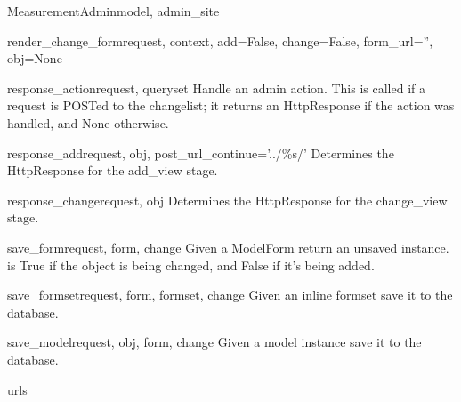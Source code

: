 \documentclass[letterpaper,10pt,english]{sphinxmanual}
\begin{document}
\begin{classdesc}{MeasurementAdmin}{model, admin\_site}
\hypertarget{data.admin.MeasurementAdmin.render_change_form}{}\begin{methoddesc}{render\_change\_form}{request, context, add=False, change=False, form\_url='', obj=None}\end{methoddesc}

\hypertarget{data.admin.MeasurementAdmin.response_action}{}\begin{methoddesc}{response\_action}{request, queryset}
Handle an admin action. This is called if a request is POSTed to the
changelist; it returns an HttpResponse if the action was handled, and
None otherwise.
\end{methoddesc}

\hypertarget{data.admin.MeasurementAdmin.response_add}{}\begin{methoddesc}{response\_add}{request, obj, post\_url\_continue='../\%s/'}
Determines the HttpResponse for the add\_view stage.
\end{methoddesc}

\hypertarget{data.admin.MeasurementAdmin.response_change}{}\begin{methoddesc}{response\_change}{request, obj}
Determines the HttpResponse for the change\_view stage.
\end{methoddesc}

\hypertarget{data.admin.MeasurementAdmin.save_form}{}\begin{methoddesc}{save\_form}{request, form, change}
Given a ModelForm return an unsaved instance.  is True if
the object is being changed, and False if it's being added.
\end{methoddesc}

\hypertarget{data.admin.MeasurementAdmin.save_formset}{}\begin{methoddesc}{save\_formset}{request, form, formset, change}
Given an inline formset save it to the database.
\end{methoddesc}

\hypertarget{data.admin.MeasurementAdmin.save_model}{}\begin{methoddesc}{save\_model}{request, obj, form, change}
Given a model instance save it to the database.
\end{methoddesc}

\hypertarget{data.admin.MeasurementAdmin.urls}{}\begin{memberdesc}{urls}\end{memberdesc}
\end{classdesc}
\end{document}
